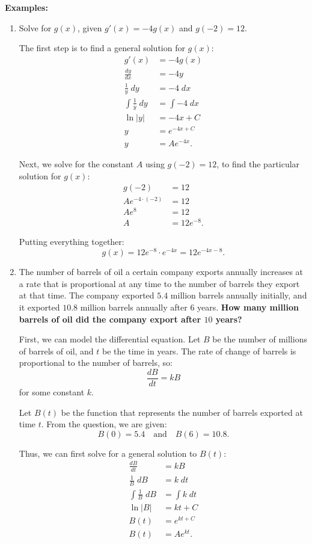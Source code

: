 \noindent \textbf{Examples:}
\begin{enumerate}
	\item Solve for $g(x)$, given $g'(x) = -4 g(x)$ and $g(-2) = 12$.

	The first step is to find a general solution for $g(x)$:
	\begin{align*}
		g'(x) &= -4 g(x) \\
		\frac{dy}{dx} &= -4y \\[5pt]
		\frac{1}{y} \; dy &= -4 \; dx \\[5pt]
		\int \frac{1}{y} \; dy &= \int -4 \; dx \\[5pt]
		\ln |y| &= -4x + C \\
		y &= e^{-4x + C} \\
		y &= A e^{-4x}.
	\end{align*}

	Next, we solve for the constant $A$ using $g(-2) = 12$, to find the particular solution for $g(x)$:
	\begin{align*}
		g(-2) &= 12 \\
		A e^{-4 \cdot (-2)} &= 12 \\
		A e^8 &= 12 \\
		A &= 12 e^{-8}.
	\end{align*}

	Putting everything together:
	\[ g(x) = 12 e^{-8} \cdot e^{-4x} = 12 e^{-4x - 8}. \]

	\item The number of barrels of oil a certain company exports annually increases at a rate that is proportional at any time to the number of barrels they export at that time. The company exported $5.4$ million barrels annually initially, and it exported $10.8$ million barrels annually after $6$ years. \textbf{How many million barrels of oil did the company export after $10$ years?}

	First, we can model the differential equation. Let $B$ be the number of millions of barrels of oil, and $t$ be the time in years. The rate of change of barrels is proportional to the number of barrels, so:
	\[ \frac{dB}{dt} = kB \]
	for some constant $k$.

	Let $B(t)$ be the function that represents the number of barrels exported at time $t$. From the question, we are given:
	\[ B(0) = 5.4 \quad \text{and} \quad B(6) = 10.8. \]

	Thus, we can first solve for a general solution to $B(t)$:
	\begin{align*}
		\frac{dB}{dt} &= kB \\[5pt]
		\frac{1}{B} \; dB &= k \; dt \\[5pt]
		\int \frac{1}{B} \; dB &= \int k \; dt \\[5pt]
		\ln |B| &= kt + C \\
		B(t) &= e^{kt + C} \\
		B(t) &= A e^{kt}.
	\end{align*}


\end{enumerate}
